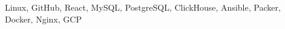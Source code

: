 \item[Technologies:] Linux, GitHub, React, MySQL, PostgreSQL, ClickHouse, 
Ansible, Packer, Docker, Nginx, GCP